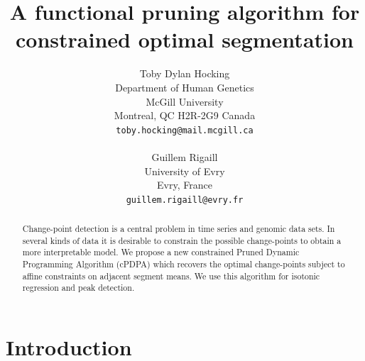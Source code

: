 \documentclass{article}
\begin{document}
\title{A functional pruning algorithm for constrained optimal segmentation}

\author{
  Toby Dylan Hocking\\
  Department of Human Genetics\\
  McGill University\\
  Montreal, QC H2R-2G9 Canada \\
  \texttt{toby.hocking@mail.mcgill.ca} \\
   \\
  Guillem Rigaill \\
  University of Evry \\
  Evry, France \\
  \texttt{guillem.rigaill@evry.fr} \\
}

\maketitle

\begin{abstract}
  Change-point detection is a central problem in time series and
  genomic data sets. In several kinds of data it is desirable to
  constrain the possible change-points to obtain a more interpretable
  model. We propose a new constrained Pruned Dynamic Programming
  Algorithm (cPDPA) which recovers the optimal change-points subject
  to affine constraints on adjacent segment means. We use this
  algorithm for isotonic regression and peak detection.
\end{abstract}

\section{Introduction}
\end{document}
